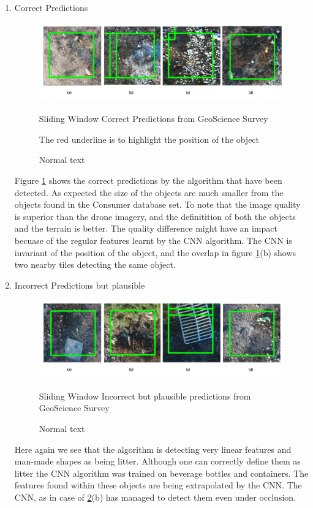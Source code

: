 \documentclass{article}
\begin{document}
\begin{enumerate}
\item Correct Predictions
\begin{figure}[H]
\centering
\label{fig:correct2}
\includegraphics[scale=0.4]{images/test1-correct1.png}
\caption{Sliding Window Correct Predictions from GeoScience Survey}
{\tiny The red underline is to highlight the position of the object}
\caption{Normal text }
\end{figure}

Figure \ref{fig:correct2} shows the correct predictions by the algorithm that have been detected. As expected the size of the objects are much smaller from the objects found in the Consumer database set. To note that the image quality is superior than the drone imagery, and the definitition of both the objects and the terrain is better. The quality difference might have an impact becuase of the regular features learnt by the CNN algorithm. The CNN is invariant of the position of the object, and the overlap in figure \ref{fig:correct2}(b) shows two nearby tiles detecting the same object.\newline


\item Incorrect Predictions but plausible
\begin{figure}[H]
\centering
\label{fig:plausible2}
\includegraphics[scale=0.4]{images/test1-plausible1.png}
\caption{Sliding Window Incorrect but plausible predictions from GeoScience Survey}
\caption{Normal text }
\end{figure}

Here again we see that the algorithm is detecting very linear features and man-made shapes as being litter. Although one can correctly define them as litter the CNN algorithm was trained on beverage bottles and containers. The features found within these objects are being extrapolated by the CNN. The CNN, as in case of \ref{fig:plausible2}(b) has managed to detect them even under occlusion. 


\end{enumerate}
\end{document}
